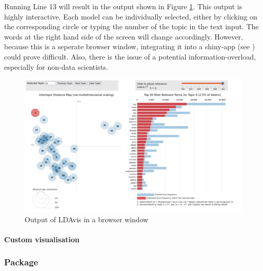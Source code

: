 Running Line 13 will result in the output shown in Figure \ref{fig:output-ldavis}. This output is highly interactive. Each model can be individually selected, either by clicking on the corresponding circle or typing the number of the topic in the text input. The words at the right hand side of the screen will change accordingly. However, because this is a seperate browser window, integrating it into a shiny-app (see ) could prove difficult. Also, there is the issue of a potential information-overload, especially for non-data scientists.
\begin{figure}
    \centering
    \includegraphics[scale=0.3]{images/dlengsteiner/output-LDAvis.png}
    \caption{Output of LDAvis in a browser window}
    \label{fig:output-ldavis}
\end{figure}


\paragraph{Custom visualisation} 


\subsubsection{Package }


